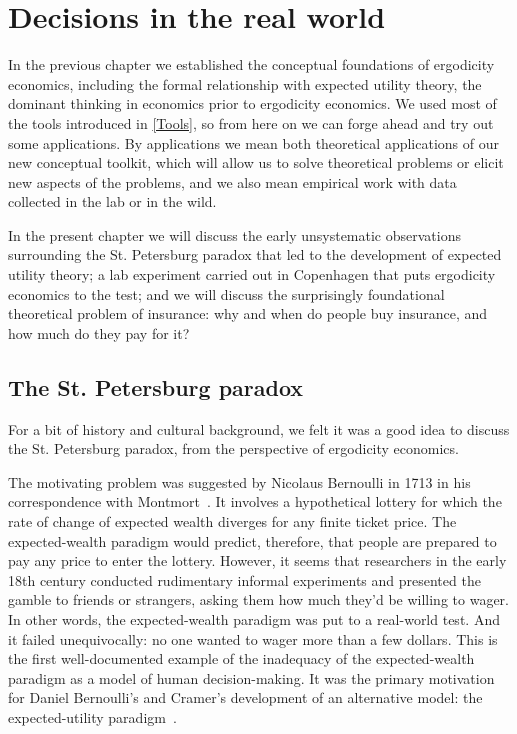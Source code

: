 \chapter{Decisions in the real world}
In the previous chapter we established the conceptual foundations of ergodicity economics, 
including the formal relationship with expected utility theory, the dominant thinking in economics 
prior to ergodicity economics. We used most of the tools introduced in \cref{Tools}, so from 
here on we can forge ahead and try out some applications. By applications we mean both 
theoretical applications of our new conceptual toolkit, which will allow us to solve theoretical
problems or elicit new aspects of the problems, and we also mean empirical work with data
collected in the lab or in the wild.

In the present chapter we will discuss the early unsystematic observations surrounding the 
St. Petersburg paradox that led to the 
development of expected utility theory; a lab experiment carried out in Copenhagen that puts 
ergodicity economics to the 
test; and we will discuss the surprisingly foundational theoretical problem of insurance: why 
and when do people buy insurance, and how much do they pay for it?

\section{The St. Petersburg paradox}
For a bit of history and cultural background, we felt it was a good idea to discuss the 
St. Petersburg paradox, from the perspective of ergodicity economics.

The motivating problem was suggested by Nicolaus 
Bernoulli
in 1713 in his 
correspondence with Montmort~\cite{Montmort1713}. 
It involves a hypothetical 
lottery for which the rate of change of expected wealth diverges for any finite ticket 
price. The expected-wealth paradigm would predict, therefore, that people are 
prepared to pay any price to enter the lottery. However, it seems that researchers
in the early 18th century conducted rudimentary informal experiments and presented
the gamble to friends or strangers, asking them how much they'd be willing to wager.
In other words, the expected-wealth paradigm was put to a real-world test. And it failed 
unequivocally: no one wanted to wager more than a few dollars. This is the first 
well-documented example of the inadequacy of the 
expected-wealth paradigm as a model of human decision-making. It was the primary 
motivation for Daniel Bernoulli's and Cramer's development of an alternative model: the
expected-utility paradigm~\cite{Bernoulli1738}. 

